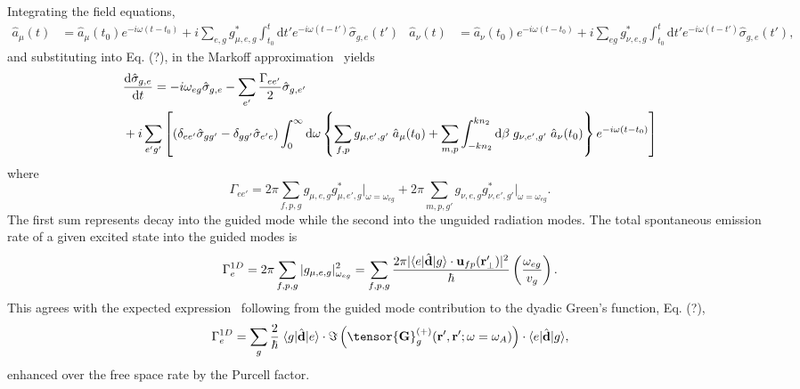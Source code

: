\documentclass[preprint,aps,pra,onecolumn]{revtex4-1} %
\begin{document}
Integrating the field equations, 
\begin{subequations}\label{eq:aout1}
\begin{align}
\hat{a}_\mu(t) &= \hat{a}_\mu(t_0) e^{-i\omega (t-t_0)} +i \sum_{e,g} g_{\mu,e,g}^* \int_{t_0}^t 
\mathrm{d} t' e^{-i\omega (t-t')}\hat{\sigma}_{g,e}(t')
\end{align}
\begin{align}
\hat{a}_\nu (t) &= \hat{a}_\nu (t_0) e^{-i\omega (t-t_0)} +i \sum_{eg} g_{\nu,e,g}^* \int_{t_0}^t \mathrm{d} 
t' e^{-i\omega (t-t')}\hat{\sigma}_{g,e}(t'),
\end{align}
\end{subequations}
and substituting into Eq. (?), in the Markoff approximation~\cite{?} yields
\begin{align}
&\frac{{\mathrm d} {\hat{\sigma}_{g,e}}}{{\mathrm d}t} =-i\omega_{eg} 
\hat{\sigma}_{g,e}-\sum_{e'}\frac{\Gamma_{ee'}}{2}\hat{\sigma}_{g,e'} \nonumber \\
&+i \sum_{e'g'}\left[ (\delta_{ee'} \hat{\sigma}_{gg'} - \delta_{gg'} 
\hat{\sigma}_{e'e})\int_0^{\infty}\mathrm{d}\omega \left\{\sum_{f,p}  g_{\mu, e',g'}\; \hat{a}_\mu (t_0) 
+\sum_{m,p}  \int_{-kn_2}^{kn_2}\mathrm{d}\beta \; g_{\nu, e',g'} \;\hat{a}_\nu(t_0)   \right\} e^{-i\omega 
(t-t_0)}\right]
\end{align}
where 
\begin{equation}
\Gamma_{ee'} = 2\pi \sum_{f,p,g} g_{\mu,e,g}g^*_{\mu,e',g} \vert_{\omega=\omega_{eg}}+2\pi 
\sum_{m,p,g'} g_{\nu,e,g}g^*_{\nu,e',g'} \vert_{\omega=\omega_{eg}}.
\end{equation}
The first sum represents decay into the guided mode while the second into the unguided radiation 
modes.  The total spontaneous emission rate of a given excited state into the guided modes is
\begin{equation}
\Gamma_e^{1D}= 2\pi \sum_{f,p,g} |g_{\mu,e,g}|^2_{\omega_{eg}} =  \sum_{f,p,g}\frac{2 \pi 
|\langle{e}\rvert\hat{\mathbf{d}}\lvert{g}\rangle \cdot \mathbf{u}_{fp}(\mathbf{r}'_\perp)|^2}{\hbar} 
\left(\frac{\omega_{eg}}{v_g}\right).
\end{equation}
This agrees with the expected expression~\cite{?} following from the guided mode contribution to the 
dyadic Green's function, Eq. (?),
\begin{equation}
\Gamma_e^{1D} = \sum_{g}   \frac{2}{\hbar} \; \bra{g}\hat{\mathbf{d}}\ket{e}\cdot 
\Im\left(\tensor{\mathbf{G}}^{(+)}_g(\br', \br'; \omega= \omega_A) \right) \cdot 
\bra{e}\hat{\mathbf{d}}\ket{g},
\end{equation}
enhanced over the free space rate by the Purcell factor. 
\end{document}
